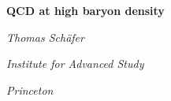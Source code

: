 

\textheight 28cm
\textwidth 16cm
\hoffset -1cm
\voffset -2cm


\pagestyle{plain}


\centerline{\Large\bf QCD at high baryon density}
\vspace*{0.8cm}
\centerline{\large\it Thomas Sch\"afer}
\vspace*{0.3cm}
\centerline{\large\it Institute for Advanced Study}
\vspace*{0.3cm}
\centerline{\large\it Princeton}


\begin{figure}[h]
\begin{center}
\begin{minipage}{70mm}
\epsfxsize=14cm
\end{minipage}
\end{center}
\end{figure}







